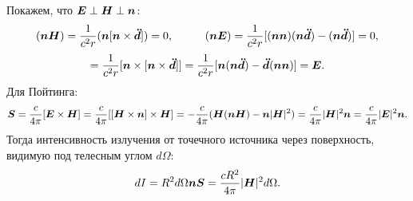 Покажем, что $\mbox{\boldmath $E$} \perp \mbox{\boldmath $H$} \perp \mbox{\boldmath $n$}$:
\begin{equation*}
	(\mbox{\boldmath $n$} \mbox{\boldmath $H$}) = \frac{1 }{c^2 r} (\mbox{\boldmath $n$} [\mbox{\boldmath $n$} \times \mbox{\boldmath $\ddot{d}$}]) = 0,
	\hspace{1 cm}
	(\mbox{\boldmath $n$} \mbox{\boldmath $E$}) = \frac{1}{c^2 r} [(\mbox{\boldmath $n$} \mbox{\boldmath $n$}) (\mbox{\boldmath $n$} \mbox{\boldmath $\ddot{d}$}) - (\mbox{\boldmath $n$} \mbox{\boldmath $\ddot{d}$})] = 0,
\end{equation*}
\begin{equation*}
	[\vc{n} \times \vc{H}] = \frac{1}{c^2 r} [\vc{n} \times[\vc{n} \times \vc{\ddot{d}}]] = \frac{1}{c^2 r} [ \vc{n} (\vc{n} \vc{\ddot{d}}) - \vc{\ddot{d}} (\vc{n} \vc{n})] = \vc{E}.
\end{equation*}
Для Пойтинга:
\begin{equation*}
	\mbox{\boldmath $S$} = \frac{c}{4 \pi} [\mbox{\boldmath $E$} \times \mbox{\boldmath $H$}] = \frac{c}{4 \pi} [ [\mbox{\boldmath $H$} \times \mbox{\boldmath $n$}] \times \mbox{\boldmath $H$}] = -\frac{c}{4 \pi} (\mbox{\boldmath $H$} (\mbox{\boldmath $n$} \mbox{\boldmath $H$}) - \mbox{\boldmath $n$} |\mbox{\boldmath $H$}|^2) = \frac{c}{4 \pi} |\mbox{\boldmath $H$}|^2 \mbox{\boldmath $n$} = \frac{c}{4 \pi} |\mbox{\boldmath $E$}|^2 \mbox{\boldmath $n$}.
\end{equation*}
Тогда интенсивность излучения от точечного источника через поверхность, видимую под телесным углом $d \Omega$: 
\begin{equation*}
	d I = R^2 d \Omega \mbox{\boldmath $n$} \mbox{\boldmath $S$} = \frac{c R^2}{4 \pi} |\mbox{\boldmath $H$}|^2 d \Omega.	
\end{equation*}



